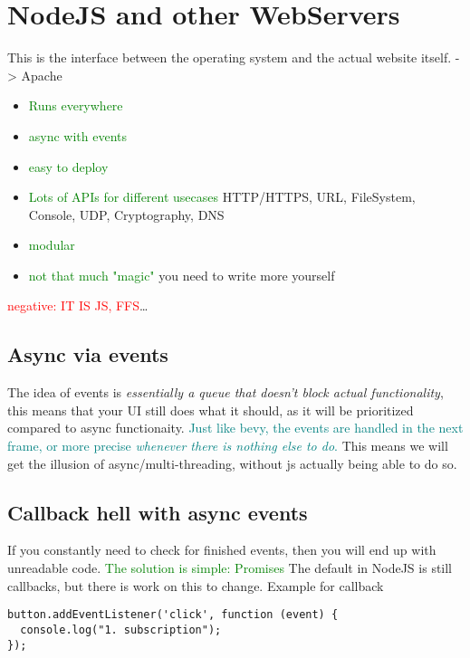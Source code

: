 \documentclass[main.tex,fontsize=8pt,paper=a4,paper=portrait,DIV=calc,]{scrartcl}
\begin{document}
\tableofcontents

\lstset{
    language=JavaScript,
    style=code,
}

\section{NodeJS and other WebServers}
This is the interface between the operating system and the actual website itself. -> Apache\newline
\begin{itemize}
\item \textcolor{green}{Runs everywhere}
\item \textcolor{green}{async with events}
\item \textcolor{green}{easy to deploy}
\item \textcolor{green}{Lots of APIs for different usecases}\newline
  HTTP/HTTPS, URL, FileSystem, Console, UDP, Cryptography, DNS
\item \textcolor{green}{modular}
\item \textcolor{green}{not that much "magic"}\newline
  you need to write more yourself
\end{itemize} 
\textcolor{red}{negative: IT IS JS, FFS}\dots

\subsection{Async via events}
The idea of events is \emph{essentially a queue that doesn't block actual functionality}, this means that your UI still does what it should, as it will be prioritized compared to async functionaity.\newline
\textcolor{teal}{Just like bevy, the events are handled in the next frame, or more precise \emph{whenever there is nothing else to do}.}\newline
This means we will get the illusion of async/multi-threading, without js actually being able to do so.

\subsection{Callback hell with async events}
If you constantly need to check for finished events, then you will end up with unreadable code.\newline
\textcolor{green}{The solution is simple: Promises}\newline
The default in NodeJS is still callbacks, but there is work on this to change.\newline
Example for callback 
\begin{lstlisting}
button.addEventListener('click', function (event) {
  console.log("1. subscription");
});
\end{lstlisting}
\end{document}

